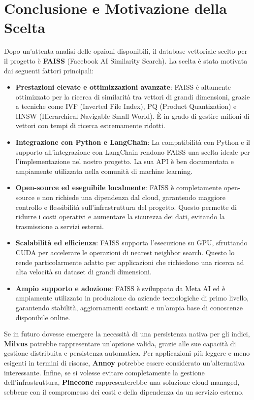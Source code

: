 \documentclass{article}
\begin{document}
\section{Conclusione e Motivazione della Scelta}

Dopo un'attenta analisi delle opzioni disponibili, il database vettoriale scelto per il progetto è \textbf{FAISS} (Facebook AI Similarity Search). La scelta è stata motivata dai seguenti fattori principali:

\begin{itemize}
    \item \textbf{Prestazioni elevate e ottimizzazioni avanzate}: FAISS è altamente ottimizzato per la ricerca di similarità tra vettori di grandi dimensioni, grazie a tecniche come IVF (Inverted File Index), PQ (Product Quantization) e HNSW (Hierarchical Navigable Small World). È in grado di gestire milioni di vettori con tempi di ricerca estremamente ridotti.
    \item \textbf{Integrazione con Python e LangChain}: La compatibilità con Python e il supporto all'integrazione con LangChain rendono FAISS una scelta ideale per l'implementazione nel nostro progetto. La sua API è ben documentata e ampiamente utilizzata nella comunità di machine learning.
    \item \textbf{Open-source ed eseguibile localmente}: FAISS è completamente open-source e non richiede una dipendenza dal cloud, garantendo maggiore controllo e flessibilità sull'infrastruttura del progetto. Questo permette di ridurre i costi operativi e aumentare la sicurezza dei dati, evitando la trasmissione a servizi esterni.
    \item \textbf{Scalabilità ed efficienza}: FAISS supporta l'esecuzione su GPU, sfruttando CUDA per accelerare le operazioni di nearest neighbor search. Questo lo rende particolarmente adatto per applicazioni che richiedono una ricerca ad alta velocità su dataset di grandi dimensioni.
    \item \textbf{Ampio supporto e adozione}: FAISS è sviluppato da Meta AI ed è ampiamente utilizzato in produzione da aziende tecnologiche di primo livello, garantendo stabilità, aggiornamenti costanti e un'ampia base di conoscenze disponibile online.
\end{itemize}

Se in futuro dovesse emergere la necessità di una persistenza nativa per gli indici, \textbf{Milvus} potrebbe rappresentare un'opzione valida, grazie alle sue capacità di gestione distribuita e persistenza automatica. Per applicazioni più leggere e meno esigenti in termini di risorse, \textbf{Annoy} potrebbe essere considerato un'alternativa interessante. Infine, se si volesse evitare completamente la gestione dell'infrastruttura, \textbf{Pinecone} rappresenterebbe una soluzione cloud-managed, sebbene con il compromesso dei costi e della dipendenza da un servizio esterno.
\end{document}
